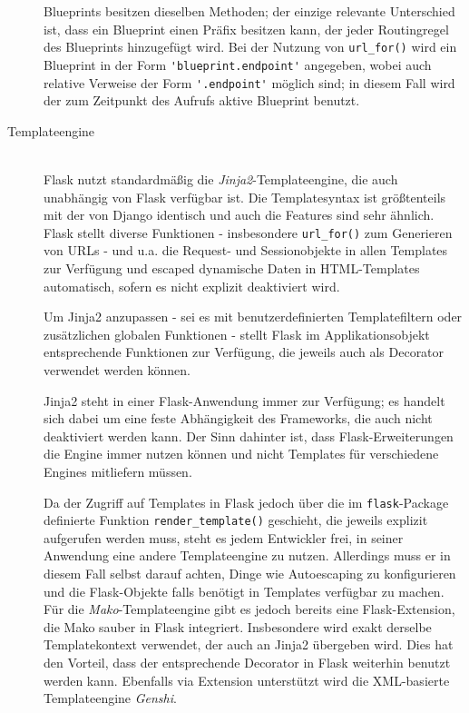 \begin{description}
Blueprints besitzen dieselben Methoden; der einzige relevante Unterschied ist, dass ein Blueprint
einen Präfix besitzen kann, der jeder Routingregel des Blueprints hinzugefügt wird. Bei der Nutzung
von \lstinline{url_for()} wird ein Blueprint in der Form \lstinline{'blueprint.endpoint'} angegeben,
wobei auch relative Verweise der Form \lstinline{'.endpoint'} möglich sind; in diesem Fall wird der
zum Zeitpunkt des Aufrufs aktive Blueprint benutzt.


\item[Templateengine] \hfill \\
Flask nutzt standardmäßig die \emph{Jinja2}-Templateengine, die auch unabhängig von Flask verfügbar
ist. Die Templatesyntax ist größtenteils mit der von Django identisch und auch die Features sind
sehr ähnlich. Flask stellt diverse Funktionen - insbesondere \lstinline{url_for()} zum Generieren
von URLs - und u.a. die Request- und Sessionobjekte in allen Templates zur Verfügung und escaped
dynamische Daten in HTML-Templates automatisch, sofern es nicht explizit deaktiviert wird.

Um Jinja2 anzupassen - sei es mit benutzerdefinierten Templatefiltern oder zusätzlichen globalen
Funktionen - stellt Flask im Applikationsobjekt entsprechende Funktionen zur Verfügung, die jeweils
auch als Decorator verwendet werden können.

Jinja2 steht in einer Flask-Anwendung immer zur Verfügung; es handelt sich dabei um eine feste
Abhängigkeit des Frameworks, die auch nicht deaktiviert werden kann. Der Sinn dahinter ist, dass
Flask-Erweiterungen die Engine immer nutzen können und nicht Templates für verschiedene Engines
mitliefern müssen.

Da der Zugriff auf Templates in Flask jedoch über die im \lstinline{flask}-Package definierte
Funktion \lstinline{render_template()} geschieht, die jeweils explizit aufgerufen werden muss, steht
es jedem Entwickler frei, in seiner Anwendung eine andere Templateengine zu nutzen. Allerdings muss
er in diesem Fall selbst darauf achten, Dinge wie Autoescaping zu konfigurieren und die
Flask-Objekte falls benötigt in Templates verfügbar zu machen. Für die \emph{Mako}-Templateengine
gibt es jedoch bereits eine Flask-Extension, die Mako sauber in Flask integriert. Insbesondere wird
exakt derselbe Templatekontext verwendet, der auch an Jinja2 übergeben wird. Dies hat den Vorteil,
dass der entsprechende Decorator in Flask weiterhin benutzt werden kann. Ebenfalls via Extension
unterstützt wird die XML-basierte Templateengine \emph{Genshi}.


\end{description}
